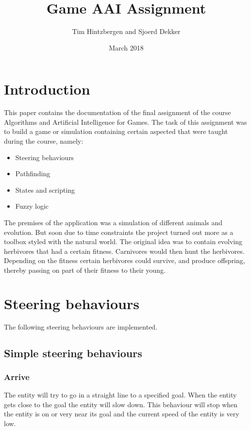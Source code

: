 \documentclass[10pt]{extarticle} %
\title{Game AAI Assignment}
\author{Tim Hintzbergen and Sjoerd Dekker}
\date{March 2018}
\begin{document}
   \maketitle
   \thispagestyle{empty}
   \newpage
   \newpage
   \setcounter{page}{1}
   \section {Introduction}
   This paper contains the documentation of the final assignment of the course Algorithms and Artificial Intelligence for Games. The task of this assignment was to build a game or simulation containing certain aspected that were taught during the course, namely:
   \begin{itemize}
      \item Steering behaviours
      \item Pathfinding
      \item States and scripting
      \item Fuzzy logic
   \end{itemize}
   The premises of the application was a simulation of different animals and evolution. But soon due to time constraints the project turned out more as a toolbox styled with the natural world. The original idea was to contain evolving herbivores that had a certain fitness. Carnivores would then hunt the herbivores. Depending on the fitness certain herbivores could survive, and produce offspring, thereby passing on part of their fitness to their young.
   \newpage

   \tableofcontents{}
   \newpage
   \section{Steering behaviours}
   The following steering behaviours are implemented. 
   \subsection{Simple steering behaviours}
   \subsubsection {Arrive}
   The entity will try to go in a straight line to a specified goal. When the entity gets close to the goal the entity will slow down. This behaviour will stop when the entity is on or very near its goal and the current speed of the entity is very low. 
\end{document}
